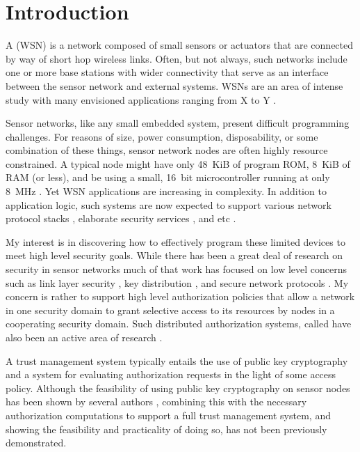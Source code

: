 \chapter{Introduction}
\label{chapter-introduction}

A  (WSN) is a network composed of small sensors or actuators
that are connected by way of short hop wireless links. Often, but not always, such networks
include one or more base stations with wider connectivity that serve as an interface between the
sensor network and external systems. WSNs are an area of intense study with many envisioned
applications ranging from X to Y \cite{XXX}.

Sensor networks, like any small embedded system, present difficult programming challenges. For
reasons of size, power consumption, disposability, or some combination of these things, sensor
network nodes are often highly resource constrained. A typical node might have only 48~KiB of
program ROM, 8~KiB of RAM (or less), and be using a small, 16~bit microcontroller running at
only 8~MHz \cite{tmotesky-datasheet}. Yet WSN applications are increasing in complexity. In
addition to application logic, such systems are now expected to support various network protocol
stacks \cite{XXX}, elaborate security services \cite{XXX}, and etc \cite{XXX}.

My interest is in discovering how to effectively program these limited devices to meet high
level security goals. While there has been a great deal of research on security in sensor
networks much of that work has focused on low level concerns such as link layer security
\cite{XXX}, key distribution \cite{XXX}, and secure network protocols \cite{1049776,XXX}. My
concern is rather to support high level authorization policies that allow a network in one
security domain to grant selective access to its resources by nodes in a cooperating security
domain. Such distributed authorization systems, called  have
also been an active area of research \cite{XXX}.

A trust management system typically entails the use of public key cryptography and a system for
evaluating authorization requests in the light of some access policy. Although the feasibility
of using public key cryptography on sensor nodes has been shown by several authors
\cite{bertoni-2006,Liu-Peng-TinyECC-2008,Szczechowiak:2008:NTL:1786014.1786040}, combining this
with the necessary authorization computations to support a full trust management system, and
showing the feasibility and practicality of doing so, has not been previously demonstrated.

